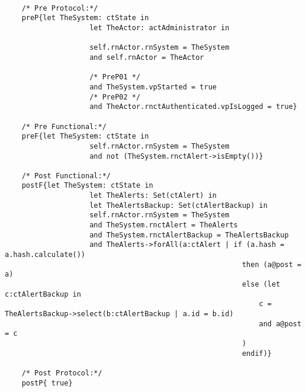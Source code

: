 	\scriptsize
	\vspace{0.5cm}
	\begin{lstlisting}[style=MessirStyle,firstnumber=auto,captionpos=b,caption={\msrmessir (MCL-oriented) specification of the operation \emph{oeCheckAlertsIntegrity}.},label=OM-actAdministrator-oeCheckAlertsIntegrity-MCL-LST]

	/* Pre Protocol:*/ 
	preP{let TheSystem: ctState in
	  				let TheActor: actAdministrator in
	  
					self.rnActor.rnSystem = TheSystem
					and self.rnActor = TheActor
	  
					/* PreP01 */
					and TheSystem.vpStarted = true
					/* PreP02 */
					and TheActor.rnctAuthenticated.vpIsLogged = true}
	
	/* Pre Functional:*/
	preF{let TheSystem: ctState in
					self.rnActor.rnSystem = TheSystem
					and not (TheSystem.rnctAlert->isEmpty())}
	
	/* Post Functional:*/ 
	postF{let TheSystem: ctState in
					let TheAlerts: Set(ctAlert) in
					let TheAlertsBackup: Set(ctAlertBackup) in
					self.rnActor.rnSystem = TheSystem
					and TheSystem.rnctAlert = TheAlerts
					and TheSystem.rnctAlertBackup = TheAlertsBackup
					and TheAlerts->forAll(a:ctAlert | if (a.hash = a.hash.calculate()) 
														then (a@post = a) 
														else (let c:ctAlertBackup in
															c = TheAlertsBackup->select(b:ctAlertBackup | a.id = b.id)
															and a@post = c
														) 
														endif)}
	
	/* Post Protocol:*/ 
	postP{ true}
	
	\end{lstlisting}
	\normalsize 
	
	
	
	






